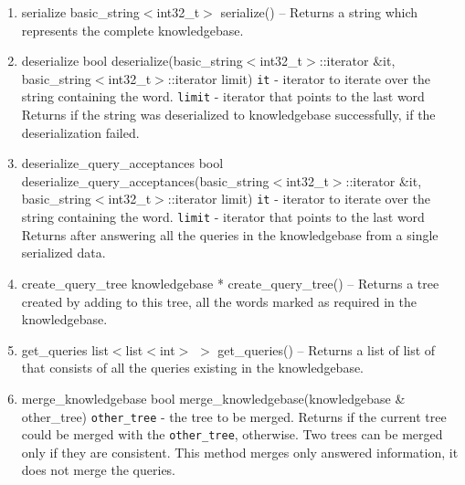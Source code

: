 \begin{enumerate}
\begin{detail}
{Generates the ``.dot'' file of the knowledgebase for graphical representation.} 
\end{detail}
\item \begin{detail}
{serialize}
{basic\_string$<$int32\_t$>$ serialize()}
{--}
{Returns a string which represents the complete knowledgebase.} 
\end{detail}
\item \begin{detail}
{deserialize}
{bool deserialize(basic\_string$<$int32\_t$>$::iterator \&it, \\ basic\_string$<$int32\_t$>$::iterator limit)}
{\texttt{it} - iterator to iterate over the string containing the word.
 \texttt{limit} - iterator that points to the last word }
{Returns \true if the string was deserialized to knowledgebase successfully, \false if the deserialization failed.} 
\end{detail}
\item \begin{detail}
{deserialize\_query\_acceptances}
{bool deserialize\_query\_acceptances(basic\_string$<$int32\_t$>$::iterator \&it,\\ basic\_string$<$int32\_t$>$::iterator limit)}
{\texttt{it} - iterator to iterate over the string containing the word.
 \texttt{limit} - iterator that points to the last word }
{Returns \true after answering all the queries in the knowledgebase from a single serialized data. } 
\end{detail}
\item \begin{detail}
{create\_query\_tree}
{knowledgebase * create\_query\_tree()}
{--}
{Returns a tree created by adding to this tree, all the words marked as required in the knowledgebase.} 
\end{detail}
\item \begin{detail}
{get\_queries}
{list$<$list$<$int$>$ $>$ get\_queries()}
{--}
{Returns a list of list of \integer that consists of all the queries existing in the knowledgebase.} 
\end{detail}
\item \begin{detail}
{merge\_knowledgebase}
{bool merge\_knowledgebase(knowledgebase \& other\_tree)}
{\texttt{other\_tree} - the tree to be merged.}
{Returns \true if the current tree could be merged with the \texttt{other\_tree}, \false otherwise. Two trees can be merged only if they are consistent. This method merges only answered information, it does not merge the queries. } 

\end{detail}
\end{enumerate}
